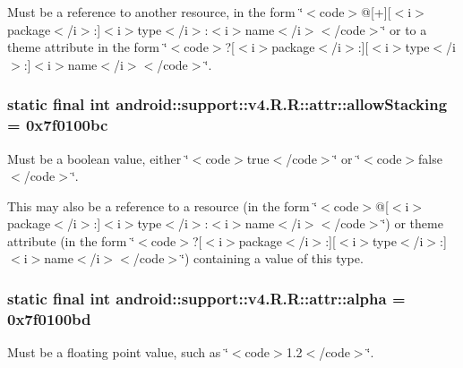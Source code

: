 Must be a reference to another resource, in the form \char`\"{}$<$code$>$@\mbox{[}+\mbox{]}\mbox{[}$<$i$>$package$<$/i$>$:\mbox{]}$<$i$>$type$<$/i$>$:$<$i$>$name$<$/i$>$$<$/code$>$\char`\"{} or to a theme attribute in the form \char`\"{}$<$code$>$?\mbox{[}$<$i$>$package$<$/i$>$:\mbox{]}\mbox{[}$<$i$>$type$<$/i$>$:\mbox{]}$<$i$>$name$<$/i$>$$<$/code$>$\char`\"{}. \hypertarget{classandroid_1_1support_1_1v4_1_1_r_1_1attr_c81ef96430e20895851010539d60c250}{
\subsubsection[{allowStacking}]{\setlength{\rightskip}{0pt plus 5cm}static final int android::support::v4.R.R::attr::allowStacking = 0x7f0100bc}}
\label{classandroid_1_1support_1_1v4_1_1_r_1_1attr_c81ef96430e20895851010539d60c250}


Must be a boolean value, either \char`\"{}$<$code$>$true$<$/code$>$\char`\"{} or \char`\"{}$<$code$>$false$<$/code$>$\char`\"{}. 

This may also be a reference to a resource (in the form \char`\"{}$<$code$>$@\mbox{[}$<$i$>$package$<$/i$>$:\mbox{]}$<$i$>$type$<$/i$>$:$<$i$>$name$<$/i$>$$<$/code$>$\char`\"{}) or theme attribute (in the form \char`\"{}$<$code$>$?\mbox{[}$<$i$>$package$<$/i$>$:\mbox{]}\mbox{[}$<$i$>$type$<$/i$>$:\mbox{]}$<$i$>$name$<$/i$>$$<$/code$>$\char`\"{}) containing a value of this type. \hypertarget{classandroid_1_1support_1_1v4_1_1_r_1_1attr_17db9a47856593299445645746937cfc}{
\subsubsection[{alpha}]{\setlength{\rightskip}{0pt plus 5cm}static final int android::support::v4.R.R::attr::alpha = 0x7f0100bd}}
\label{classandroid_1_1support_1_1v4_1_1_r_1_1attr_17db9a47856593299445645746937cfc}


Must be a floating point value, such as \char`\"{}$<$code$>$1.2$<$/code$>$\char`\"{}. 

